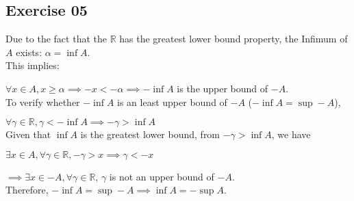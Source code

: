 \subsection*{Exercise 05}
Due to the fact that the $\mathbb{R}$ has the greatest lower bound property, the Infimum of $A$ exists: $ \alpha = \inf A $.\\
This implies:

$\forall x \in A, x \ge \alpha \implies -x<-\alpha \implies -\inf A$ is the upper bound of $-A$.\\
To verify whether $-\inf A$ is an least upper bound of $-A$ ($-\inf A = \sup -A$),

$\forall \gamma \in \mathbb{R}, \gamma < -\inf A \implies -\gamma > \inf A$ \\
Given that $\inf A$ is the greatest lower bound, from $-\gamma > \inf A$, we have

$\exists x \in A, \forall \gamma \in \mathbb{R}, -\gamma > x \implies \gamma < -x $

$\implies \exists x \in -A, \forall \gamma \in \mathbb{R}$, $\gamma$ is not an upper bound of $-A$. \\
Therefore, $-\inf A = \sup -A \implies \inf A = -\sup A$.
